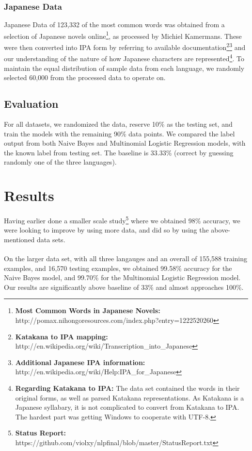 \documentclass[a4paper]{article}
\begin{document}
\subsubsection{Japanese Data}
Japanese Data of 123,332 of the most common words was obtained from a selection of Japanese novels online\footnote{\textbf{Most Common Words in Japanese Novels:} http://pomax.nihongoresources.com/index.php?entry=1222520260}, as processed by Michiel Kamermans. These were then converted into IPA form by referring to available documentation\footnote{\textbf{Katakana to IPA mapping: }http://en.wikipedia.org/wiki/Transcription\_into\_Japanese}\footnote{\textbf{Additional Japanese IPA information: }http://en.wikipedia.org/wiki/Help:IPA\_for\_Japanese} and our understanding of the nature of how Japanese characters are represented\footnote{\textbf{Regarding Katakana to IPA: }The data set contained the words in their original forms, as well as parsed Katakana representations. As Katakana is a Japanese syllabary, it is not complicated to convert from Katakana to IPA. The hardest part was getting Windows to cooperate with UTF-8.}. To maintain the equal distribution of sample data from each language, we randomly selected 60,000 from the processed data to operate on.


\subsection{Evaluation}
For all datasets, we randomized the data, reserve 10\% as the testing set, and train the models with the remaining 90\% data points. We compared the label output from both Naive Bayes and Multinomial Logistic Regression models, with the known label from testing set. The baseline is 33.33\% (correct by guessing randomly one of the three languages).

\section{Results}
Having earlier done a smaller scale study\footnote{\textbf{Status Report:} https://github.com/violxy/nlpfinal/blob/master/StatusReport.txt} where we obtained 98\% accuracy, we were looking to improve by using more data, and did so by using the above-mentioned data sets.\\
\\On the larger data set, with all three langauges and an overall of 155,588 training examples, and 16,570 testing examples, we obtained 99.58\% accuracy for the Naive Bayes model, and 99.70\% for the Multinomial Logistic Regression model. Our results are significantly above baseline of 33\% and almost approaches 100\%.\\
\end{document}
